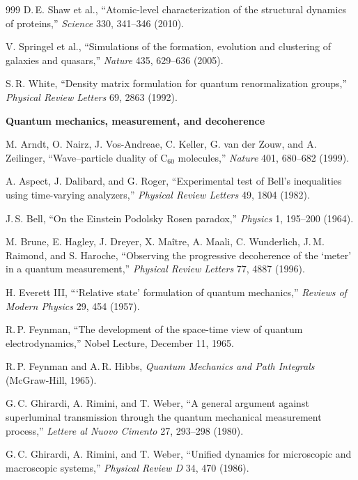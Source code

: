 \begin{thebibliography}{999}
 D.\,E. Shaw et al., ``Atomic-level characterization of the structural dynamics of proteins,'' \textit{Science} 330, 341--346 (2010).

 V. Springel et al., ``Simulations of the formation, evolution and clustering of galaxies and quasars,'' \textit{Nature} 435, 629--636 (2005).

 S.\,R. White, ``Density matrix formulation for quantum renormalization groups,'' \textit{Physical Review Letters} 69, 2863 (1992).

\item[] \textbf{Quantum mechanics, measurement, and decoherence}

 M. Arndt, O. Nairz, J. Vos-Andreae, C. Keller, G. van der Zouw, and A. Zeilinger, ``Wave--particle duality of C\(_{60}\) molecules,'' \textit{Nature} 401, 680--682 (1999).

 A. Aspect, J. Dalibard, and G. Roger, ``Experimental test of Bell's inequalities using time-varying analyzers,'' \textit{Physical Review Letters} 49, 1804 (1982).

 J.\,S. Bell, ``On the Einstein Podolsky Rosen paradox,'' \textit{Physics} 1, 195--200 (1964).

 M. Brune, E. Hagley, J. Dreyer, X. Ma\^itre, A. Maali, C. Wunderlich, J.\,M. Raimond, and S. Haroche, ``Observing the progressive decoherence of the `meter' in a quantum measurement,'' \textit{Physical Review Letters} 77, 4887 (1996).

 H. Everett III, ```Relative state' formulation of quantum mechanics,'' \textit{Reviews of Modern Physics} 29, 454 (1957).

 R.\,P. Feynman, ``The development of the space-time view of quantum electrodynamics,'' Nobel Lecture, December 11, 1965.

 R.\,P. Feynman and A.\,R. Hibbs, \textit{Quantum Mechanics and Path Integrals} (McGraw-Hill, 1965).

 G.\,C. Ghirardi, A. Rimini, and T. Weber, ``A general argument against superluminal transmission through the quantum mechanical measurement process,'' \textit{Lettere al Nuovo Cimento} 27, 293--298 (1980).

 G.\,C. Ghirardi, A. Rimini, and T. Weber, ``Unified dynamics for microscopic and macroscopic systems,'' \textit{Physical Review D} 34, 470 (1986).


\end{thebibliography}
